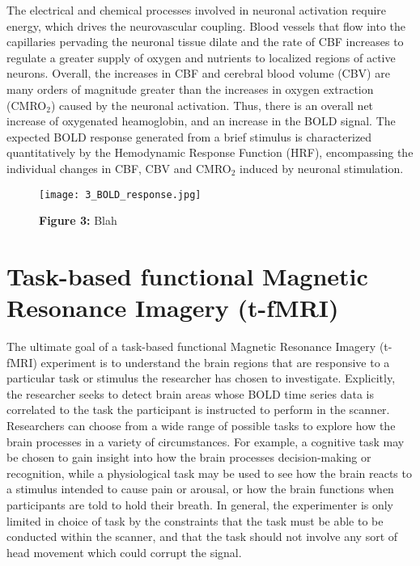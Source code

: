 The electrical and chemical processes involved in neuronal activation require energy, which drives the neurovascular coupling. Blood vessels that flow into the capillaries pervading the neuronal tissue dilate and the rate of CBF increases to regulate a greater supply of oxygen and nutrients to localized regions of active neurons. Overall, the increases in CBF and cerebral blood volume (CBV) are many orders of magnitude greater than the increases in oxygen extraction (CMRO$_{2}$) caused by the neuronal activation. Thus, there is an overall net increase of oxygenated heamoglobin, and an increase in the BOLD signal. The expected BOLD response generated from a brief stimulus is characterized quantitatively by the Hemodynamic Response Function (HRF), encompassing the individual changes in CBF, CBV and CMRO$_{2}$ induced by neuronal stimulation. 

\begin{figure}[htbp]
\centering
	\texttt{[image: 3\_BOLD\_response.jpg]}	
\caption*{\textbf{Figure 3:} Blah}
\end{figure}


\section{Task-based functional Magnetic Resonance Imagery (t-fMRI)}

The ultimate goal of a task-based functional Magnetic Resonance Imagery (t-fMRI) experiment is to understand the brain regions that are responsive to a particular task or stimulus the researcher has chosen to investigate. Explicitly, the researcher seeks to detect brain areas whose BOLD time series data is correlated to the task the participant is instructed to perform in the scanner. Researchers can choose from a wide range of possible tasks to explore how the brain processes in a variety of circumstances. For example, a cognitive task may be chosen to gain insight into how the brain processes decision-making or recognition, while a physiological task may be used to see how the brain reacts to a stimulus intended to cause pain or arousal, or how the brain functions when participants are told to hold their breath. In general, the experimenter is only limited in choice of task by the constraints that the task must be able to be conducted within the scanner, and that the task should not involve any sort of head movement which could corrupt the signal. 

